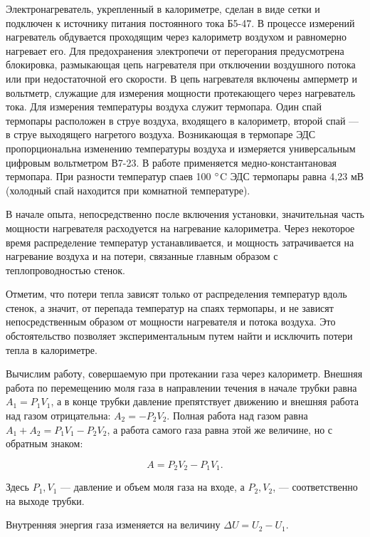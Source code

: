 \documentclass[a4paper,12pt]{article} %
\begin{document}
Электронагреватель, укрепленный в калориметре, сделан в виде сетки и подключен к источнику питания постоянного тока Б5-47. В процессе измерений нагреватель обдувается проходящим через калориметр воздухом и равномерно нагревает его. Для предохранения электропечи от перегорания предусмотрена блокировка, размыкающая цепь нагревателя при отключении воздушного потока или при недостаточной его скорости. В цепь нагревателя включены амперметр и вольтметр, служащие для измерения мощности протекающего через нагреватель тока. Для измерения температуры воздуха служит термопара. Один спай термопары расположен в струе воздуха, входящего в калориметр, второй спай — в струе выходящего нагретого воздуха. Возникающая в термопаре ЭДС пропорциональна изменению температуры воздуха и измеряется универсальным цифровым вольтметром В7-23. В работе применяется медно-константановая термопара. При разности температур спаев 100 $\degree$C ЭДС термопары равна 4,23 мВ (холодный спай находится при комнатной температуре).


В начале опыта, непосредственно после включения установки, значительная часть мощности нагревателя расходуется на нагревание калориметра. Через некоторое время распределение температур устанавливается, и мощность затрачивается на нагревание воздуха и на потери, связанные главным образом с теплопроводностью стенок.


Отметим, что потери тепла зависят только от распределения температур вдоль стенок, а значит, от перепада температур на спаях термопары, и не зависят непосредственным образом от мощности нагревателя и потока воздуха. Это обстоятельство позволяет экспериментальным путем найти и исключить потери тепла в калориметре.


Вычислим работу, совершаемую при протекании газа через калориметр. Внешняя работа по перемещению моля газа в направлении течения в начале трубки равна $A_{1} = P_{1}V_{1}$, а в конце трубки давление препятствует движению и внешняя работа над газом отрицательна: $A_{2} = -P_{2}V_{2}$. Полная работа над газом равна $A_{1} + A_{2} = P_{1}V_{1} - P_{2}V_{2}$, а работа самого газа равна этой же величине, но с обратным знаком:


\begin{equation*}
	A = P_{2}V_{2} - P_{1}V_{1}.
\end{equation*}


\noindent Здесь $P_{1}, V_{1}$ — давление и объем моля газа на входе, а $P_{2}, V_{2}$, — соответственно на выходе трубки. 


Внутренняя энергия газа изменяется на величину $\Delta U = U_{2} - U_{1}$.
\end{document}
